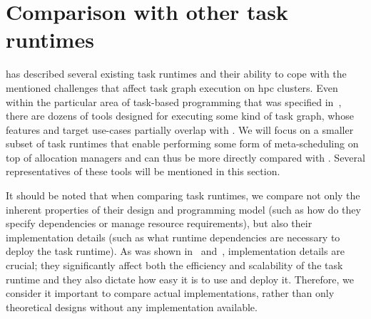 \section{Comparison with other task runtimes}
\label{hq:related-work}
 has described several existing task runtimes and their ability to cope
with the mentioned challenges that affect task graph execution on \gls{hpc} clusters.
Even within the particular area of task-based programming that was specified
in~, there are dozens of tools designed for executing some kind of task
graph, whose features and target use-cases partially overlap with \hyperqueue{}. We will
focus on a smaller subset of task runtimes that enable performing some form of meta-scheduling on
top of allocation managers and can thus be more directly compared with \hyperqueue{}.
Several representatives of these tools will be mentioned in this section.

It should be noted that when comparing task runtimes, we compare not only the inherent properties
of their design and programming model (such as how do they specify dependencies or manage resource
requirements), but also their implementation details (such as what runtime dependencies are
necessary to deploy the task runtime). As was shown in~
and~, implementation details are crucial; they significantly affect both the
efficiency and scalability of the task runtime and they also dictate how easy it is to use and
deploy it. Therefore, we consider it important to compare actual implementations, rather than only
theoretical designs without any implementation available.



